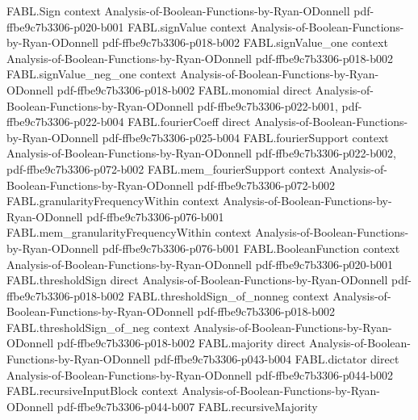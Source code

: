 \begin{theorem}
\label{FABL.dictator_odd}
\leanok
{}
\proofstep
  {FABL.Sign}
  {context}
  {Analysis-of-Boolean-Functions-by-Ryan-ODonnell}
  {pdf-ffbe9c7b3306-p020-b001}
\proofstep
  {FABL.signValue}
  {context}
  {Analysis-of-Boolean-Functions-by-Ryan-ODonnell}
  {pdf-ffbe9c7b3306-p018-b002}
\proofstep
  {FABL.signValue_one}
  {context}
  {Analysis-of-Boolean-Functions-by-Ryan-ODonnell}
  {pdf-ffbe9c7b3306-p018-b002}
\proofstep
  {FABL.signValue_neg_one}
  {context}
  {Analysis-of-Boolean-Functions-by-Ryan-ODonnell}
  {pdf-ffbe9c7b3306-p018-b002}
\proofstep
  {FABL.monomial}
  {direct}
  {Analysis-of-Boolean-Functions-by-Ryan-ODonnell}
  {pdf-ffbe9c7b3306-p022-b001,
    pdf-ffbe9c7b3306-p022-b004}
\proofstep
  {FABL.fourierCoeff}
  {direct}
  {Analysis-of-Boolean-Functions-by-Ryan-ODonnell}
  {pdf-ffbe9c7b3306-p025-b004}
\proofstep
  {FABL.fourierSupport}
  {context}
  {Analysis-of-Boolean-Functions-by-Ryan-ODonnell}
  {pdf-ffbe9c7b3306-p022-b002,
    pdf-ffbe9c7b3306-p072-b002}
\proofstep
  {FABL.mem_fourierSupport}
  {context}
  {Analysis-of-Boolean-Functions-by-Ryan-ODonnell}
  {pdf-ffbe9c7b3306-p072-b002}
\proofstep
  {FABL.granularityFrequencyWithin}
  {context}
  {Analysis-of-Boolean-Functions-by-Ryan-ODonnell}
  {pdf-ffbe9c7b3306-p076-b001}
\proofstep
  {FABL.mem_granularityFrequencyWithin}
  {context}
  {Analysis-of-Boolean-Functions-by-Ryan-ODonnell}
  {pdf-ffbe9c7b3306-p076-b001}
\proofstep
  {FABL.BooleanFunction}
  {context}
  {Analysis-of-Boolean-Functions-by-Ryan-ODonnell}
  {pdf-ffbe9c7b3306-p020-b001}
\proofstep
  {FABL.thresholdSign}
  {direct}
  {Analysis-of-Boolean-Functions-by-Ryan-ODonnell}
  {pdf-ffbe9c7b3306-p018-b002}
\proofstep
  {FABL.thresholdSign_of_nonneg}
  {context}
  {Analysis-of-Boolean-Functions-by-Ryan-ODonnell}
  {pdf-ffbe9c7b3306-p018-b002}
\proofstep
  {FABL.thresholdSign_of_neg}
  {context}
  {Analysis-of-Boolean-Functions-by-Ryan-ODonnell}
  {pdf-ffbe9c7b3306-p018-b002}
\proofstep
  {FABL.majority}
  {direct}
  {Analysis-of-Boolean-Functions-by-Ryan-ODonnell}
  {pdf-ffbe9c7b3306-p043-b004}
\proofstep
  {FABL.dictator}
  {direct}
  {Analysis-of-Boolean-Functions-by-Ryan-ODonnell}
  {pdf-ffbe9c7b3306-p044-b002}
\proofstep
  {FABL.recursiveInputBlock}
  {context}
  {Analysis-of-Boolean-Functions-by-Ryan-ODonnell}
  {pdf-ffbe9c7b3306-p044-b007}
\proofstep
  {FABL.recursiveMajority}

\end{theorem}
